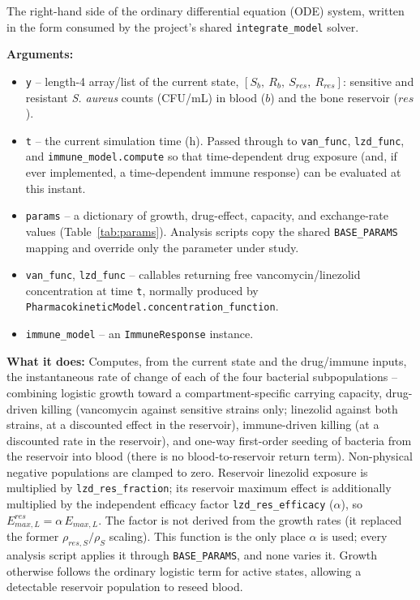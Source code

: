 \documentclass[11pt]{article}
\begin{document}
The right-hand side of the ordinary differential equation (ODE) system,
written in the form consumed by the project's shared
\texttt{integrate\_model} solver.

\textbf{Arguments:}
\begin{itemize}
\item \texttt{y} -- length-4 array/list of the current state,
$[S_b,\ R_b,\ S_{res},\ R_{res}]$: sensitive and resistant \textit{S.
aureus} counts (CFU/mL) in blood ($b$) and the bone reservoir ($res$).
\item \texttt{t} -- the current simulation time (h). Passed through to
\texttt{van\_func}, \texttt{lzd\_func}, and \texttt{immune\_model.compute}
so that time-dependent drug exposure (and, if ever implemented, a
time-dependent immune response) can be evaluated at this instant.
\item \texttt{params} -- a dictionary of growth, drug-effect, capacity, and
exchange-rate values (Table~\ref{tab:params}). Analysis scripts copy the
shared \texttt{BASE\_PARAMS} mapping and override only the parameter under
study.
\item \texttt{van\_func}, \texttt{lzd\_func} -- callables returning free
vancomycin/linezolid concentration at time \texttt{t}, normally produced by
\texttt{PharmacokineticModel.concentration\_function}.
\item \texttt{immune\_model} -- an \texttt{ImmuneResponse} instance.
\end{itemize}

\textbf{What it does:} Computes, from the current state and the drug/immune
inputs, the instantaneous rate of change of each of the four bacterial
subpopulations -- combining logistic growth toward a compartment-specific
carrying capacity, drug-driven killing (vancomycin against sensitive
strains only; linezolid against both strains, at a discounted effect in the
reservoir), immune-driven killing (at a discounted rate in the reservoir),
and one-way first-order seeding of bacteria from the reservoir into blood
(there is no blood-to-reservoir return term). Non-physical negative populations are clamped to zero.
Reservoir linezolid exposure is multiplied by
\texttt{lzd\_res\_fraction}; its reservoir maximum effect is additionally
multiplied by the independent efficacy factor \texttt{lzd\_res\_efficacy}
($\alpha$), so $E_{max,L}^{res} = \alpha\,E_{max,L}$. The factor is not
derived from the growth rates (it replaced the former $\rho_{res,S}/\rho_S$
scaling). This function is the only place $\alpha$ is used; every analysis
script applies it through \texttt{BASE\_PARAMS}, and none varies it. Growth otherwise follows the ordinary
logistic term for active states, allowing a detectable reservoir population
to reseed blood.
\end{document}

